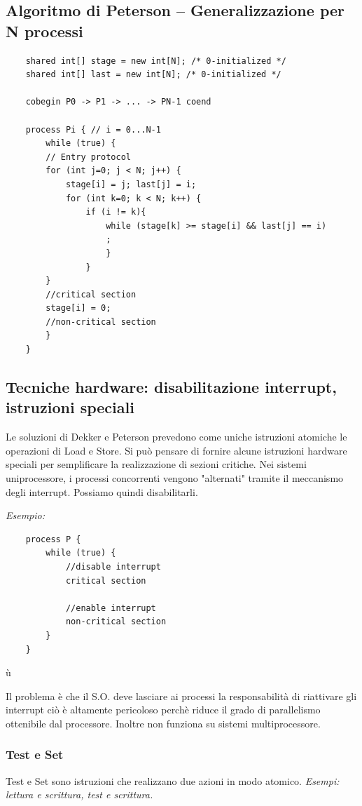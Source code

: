 \subsection{Algoritmo di Peterson – Generalizzazione per N processi}

\begin{lstlisting}
    shared int[] stage = new int[N]; /* 0-initialized */
    shared int[] last = new int[N]; /* 0-initialized */
    
    cobegin P0 -> P1 -> ... -> PN-1 coend

    process Pi { // i = 0...N-1 
        while (true) {
        // Entry protocol
        for (int j=0; j < N; j++) {
            stage[i] = j; last[j] = i;
            for (int k=0; k < N; k++) {
                if (i != k){
                    while (stage[k] >= stage[i] && last[j] == i)
                    ;
                    }
                }
        }
        //critical section
        stage[i] = 0;
        //non-critical section
        }
    }
\end{lstlisting}



\subsection{Tecniche hardware: disabilitazione interrupt, istruzioni speciali}
Le soluzioni di Dekker e Peterson prevedono come uniche istruzioni
atomiche le operazioni di Load e Store. Si può pensare di fornire alcune istruzioni hardware speciali per semplificare la realizzazione di sezioni critiche.
Nei sistemi uniprocessore, i processi concorrenti vengono "alternati" tramite il meccanismo degli interrupt.
Possiamo quindi disabilitarli.
\newline

\textit{Esempio:}

\begin{lstlisting}
    process P {
        while (true) {
            //disable interrupt
            critical section

            //enable interrupt
            non-critical section
        }
    }
\end{lstlisting}ù

Il problema è che il S.O. deve lasciare ai processi la responsabilità di riattivare gli interrupt ciò è altamente pericoloso perchè riduce il grado di parallelismo ottenibile dal processore. Inoltre non funziona su sistemi multiprocessore.
\newpage

\subsubsection{Test e Set}
Test e Set sono istruzioni che realizzano due azioni in modo atomico.
\textit{Esempi: lettura e scrittura, test e scrittura.}

